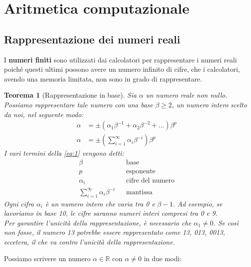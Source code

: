 \documentclass{article}
\newtheorem*{theorem}{\color{green}\textbf{Teorema}}
\numberwithin{equation}{section}
\begin{document}
\thispagestyle{empty}
\setcounter{page}{0}
\tableofcontents
\newpage

\section{Aritmetica computazionale}
\subsection{Rappresentazione dei numeri reali}
I \textbf{numeri finiti} sono utilizzati dai calcolatori per rappresentare i numeri reali poiché
questi ultimi possono avere un numero infinito di cifre, che i calcolatori, avendo una
memoria limitata, non sono in grado di rappresentare. 

\begin{theorem}[Rappresentazione in base]
    Sia $\alpha$ un numero reale non nullo. Possiamo rappresentare tale numero con una base
    $\beta\geq 2$, un numero intero scelto da noi, nel seguente modo:
    \begin{equation} \label{eq:1}
        \begin{aligned}
            \alpha&=\pm(\alpha_1\beta^{-1}+\alpha_2\beta^{-2}+\ldots)\beta^p \\ 
            \alpha&=\pm(\sum_{i=1}^{\infty}\alpha_i\beta^{-i})\beta^p
        \end{aligned}
    \end{equation}
    I vari termini della \ref{eq:1} vengono detti:
    $$\begin{array}{lll}
        \beta & & \text{base} \\ 
        p & & \text{esponente} \\ 
        \alpha_i & & \text{cifre del numero} \\
        \sum_{i=1}^{\infty}\alpha_i\beta^{-i} & & \text{mantissa}
    \end{array}$$
    Ogni cifra $\alpha_i$ è un numero intero che varia tra 0 e $\beta-1$. Ad esempio, se lavoriamo in base
    10, le cifre saranno numeri interi compresi tra 0 e 9.\\ 
    Per garantire l'unicità della rappresentazione, è necessario che $\alpha_1\neq 0$. 
    Se così non fosse, il numero 13 potrebbe essere rappresentato come 13, 013, 0013, eccetera,
    il che va contro l'unicità della rappresentazione.
\end{theorem}
Possiamo scrivere un numero $\alpha\in\mathbb{R}$ con $\alpha\neq 0$ in due modi:
\end{document}

